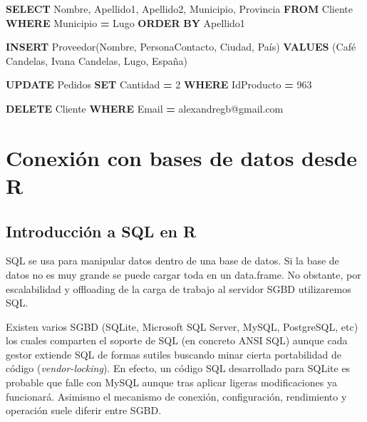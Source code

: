 \documentclass[
]{book}
\newenvironment{Shaded}{\begin{snugshade}}{\end{snugshade}}
\newcommand{\DecValTok}[1]{\textcolor[rgb]{0.00,0.00,0.81}{#1}}
\newcommand{\KeywordTok}[1]{\textcolor[rgb]{0.13,0.29,0.53}{\textbf{#1}}}
\newcommand{\NormalTok}[1]{#1}
\newcommand{\OperatorTok}[1]{\textcolor[rgb]{0.81,0.36,0.00}{\textbf{#1}}}
\newcommand{\StringTok}[1]{\textcolor[rgb]{0.31,0.60,0.02}{#1}}
\theoremstyle{break}
\theoremstyle{nonumberplain}
\begin{document}
\begin{Shaded}
\begin{Highlighting}[]
\KeywordTok{SELECT}\NormalTok{ Nombre, Apellido1, Apellido2, Municipio, Provincia }
\KeywordTok{FROM}\NormalTok{ Cliente}
\KeywordTok{WHERE}\NormalTok{ Municipio }\OperatorTok{=} \StringTok{\textquotesingle{}Lugo\textquotesingle{}}
\KeywordTok{ORDER} \KeywordTok{BY}\NormalTok{ Apellido1}

\KeywordTok{INSERT}\NormalTok{ Proveedor(Nombre, PersonaContacto, Ciudad, País)}
\KeywordTok{VALUES}\NormalTok{ (}\StringTok{\textquotesingle{}Café Candelas\textquotesingle{}}\NormalTok{, }\StringTok{\textquotesingle{}Ivana Candelas\textquotesingle{}}\NormalTok{, }\StringTok{\textquotesingle{}Lugo\textquotesingle{}}\NormalTok{, }\StringTok{\textquotesingle{}España\textquotesingle{}}\NormalTok{)}

\KeywordTok{UPDATE}\NormalTok{ Pedidos}
\KeywordTok{SET}\NormalTok{ Cantidad }\OperatorTok{=} \DecValTok{2}
\KeywordTok{WHERE}\NormalTok{ IdProducto }\OperatorTok{=} \DecValTok{963}

\KeywordTok{DELETE}\NormalTok{ Cliente}
\KeywordTok{WHERE}\NormalTok{ Email }\OperatorTok{=} \StringTok{\textquotesingle{}alexandregb@gmail.com\textquotesingle{}}
\end{Highlighting}
\end{Shaded}

\section{Conexión con bases de datos desde R}\label{conexiuxf3n-con-bases-de-datos-desde-r}

\subsection{Introducción a SQL en R}\label{introducciuxf3n-a-sql-en-r}

SQL se usa para manipular datos dentro de una base de datos. Si la base de datos no es muy grande se puede cargar toda en un data.frame.
No obstante, por escalabilidad y offloading de la carga de trabajo al servidor SGBD utilizaremos SQL.

Existen varios SGBD (SQLite, Microsoft SQL Server, MySQL, PostgreSQL, etc) los cuales comparten el soporte de SQL (en concreto ANSI SQL) aunque cada gestor extiende SQL
de formas sutiles buscando minar cierta portabilidad de código (\emph{vendor-locking}). En efecto, un código SQL desarrollado para SQLite es probable que falle con MySQL
aunque tras aplicar ligeras modificaciones ya funcionará. Asimismo el mecanismo de conexión, configuración, rendimiento y operación suele diferir entre SGBD.
\end{document}
